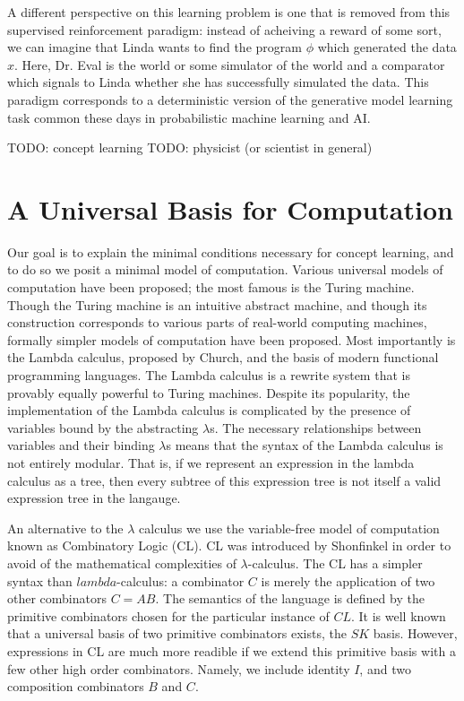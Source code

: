 \documentclass{article}
\begin{document}
A different perspective on this learning problem is one that is
removed from this supervised reinforcement paradigm: instead of
acheiving a reward of some sort, we can imagine that Linda wants to
find the program $\phi$ which generated the data $x$. Here, Dr. Eval
is the world or some simulator of the world and a comparator which
signals to Linda whether she has successfully simulated the data. This
paradigm corresponds to a deterministic version of the generative
model learning task common these days in probabilistic machine
learning and AI.

TODO: concept learning
TODO: physicist (or scientist in general) 


\section{A Universal Basis for Computation}
Our goal is to explain the minimal conditions necessary for concept
learning, and to do so we posit a minimal model of
computation. Various universal models of computation have been
proposed; the most famous is the Turing machine. Though the Turing
machine is an intuitive abstract machine, and though its construction
corresponds to various parts of real-world computing machines,
formally simpler models of computation have been proposed. Most
importantly is the Lambda calculus, proposed by Church, and the basis
of modern functional programming languages. The Lambda calculus is a
rewrite system that is provably equally powerful to Turing
machines. Despite its popularity, the implementation of the Lambda
calculus is complicated by the presence of variables bound by the
abstracting $\lambda$s. The necessary relationships between variables
and their binding $\lambda$s means that the syntax of the Lambda
calculus is not entirely modular. That is, if we represent an
expression in the lambda calculus as a tree, then every subtree of this
expression tree is not itself a valid expression tree in the langauge. 

An alternative to the $\lambda$ calculus we use the variable-free
model of computation known as Combinatory Logic (CL). CL was
introduced by Shonfinkel in order to avoid of the mathematical
complexities of $\lambda$-calculus. The CL has a simpler syntax than
$lambda$-calculus: a combinator $C$ is merely the application of two
other combinators $ C = A B$. The semantics of the language is defined
by the primitive combinators chosen for the particular instance of
$CL$. It is well known that a universal basis of two primitive
combinators exists, the $SK$ basis. However, expressions in CL are
much more readible if we extend this primitive basis with a few other
high order combinators. Namely, we include identity $I$, and two
composition combinators $B$ and $C$.
\end{document}
